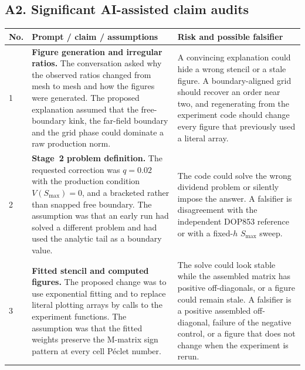 \documentclass[11pt,a4paper]{article}
\theoremstyle{definition}
\theoremstyle{remark}
\begin{document}
\subsection*{A2. Significant AI-assisted claim audits}
\begin{table}[H]
\centering
\scriptsize
\setlength{\tabcolsep}{4pt}
\begin{tabular}{@{}p{}p{}p{}@{}}
\toprule
\textbf{No.} & \textbf{Prompt / claim / assumptions} & \textbf{Risk and possible falsifier} \\
\midrule
1 & \textbf{Figure generation and irregular ratios.} The conversation asked
why the observed ratios changed from mesh to mesh and how the figures were
generated. The proposed explanation assumed that the free-boundary kink, the
far-field boundary and the grid phase could dominate a raw production norm. &
A convincing explanation could hide a wrong stencil or a stale figure. A
boundary-aligned grid should recover an order near two, and regenerating from
the experiment code should change every figure that previously used a literal
array. \\
2 & \textbf{Stage~2 problem definition.} The requested correction was
$q=0.02$ with the production condition $V(S_{\max})=0$, and a bracketed rather
than snapped free boundary. The assumption was that an early run had solved a
different problem and had used the analytic tail as a boundary value. &
The code could solve the wrong dividend problem or silently impose the answer.
A falsifier is disagreement with the independent DOP853 reference or with a
fixed-$h$ $S_{\max}$ sweep. \\
3 & \textbf{Fitted stencil and computed figures.} The proposed change was to
use exponential fitting and to replace literal plotting arrays by calls to the
experiment functions. The assumption was that the fitted weights preserve the
M-matrix sign pattern at every cell P\'eclet number. &
The solve could look stable while the assembled matrix has positive
off-diagonals, or a figure could remain stale. A falsifier is a positive
assembled off-diagonal, failure of the negative control, or a figure that does
not change when the experiment is rerun. \\
\bottomrule
\end{tabular}
\end{table}
\end{document}
